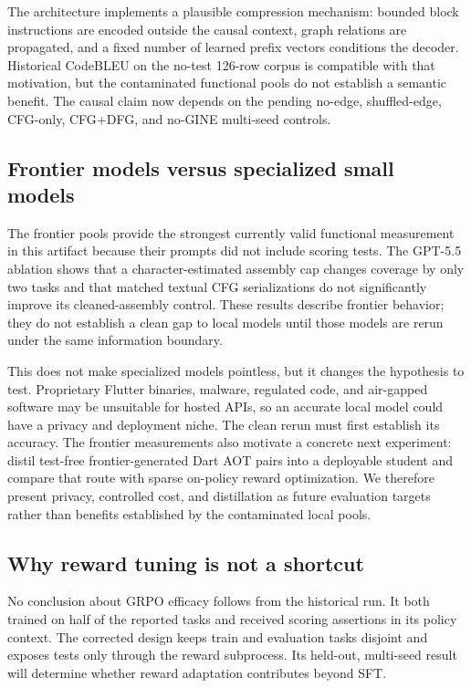 \documentclass[11pt]{article}
\begin{document}
The architecture implements a plausible compression mechanism: bounded block instructions are encoded outside the causal context, graph relations are propagated, and a fixed number of learned prefix vectors conditions the decoder. Historical CodeBLEU on the no-test 126-row corpus is compatible with that motivation, but the contaminated functional pools do not establish a semantic benefit. The causal claim now depends on the pending no-edge, shuffled-edge, CFG-only, CFG+DFG, and no-GINE multi-seed controls.

\subsection{Frontier models versus specialized small models}

The frontier pools provide the strongest currently valid functional measurement in this artifact because their prompts did not include scoring tests. The GPT-5.5 ablation shows that a character-estimated assembly cap changes coverage by only two tasks and that matched textual CFG serializations do not significantly improve its cleaned-assembly control. These results describe frontier behavior; they do not establish a clean gap to local models until those models are rerun under the same information boundary.

This does not make specialized models pointless, but it changes the hypothesis to test. Proprietary Flutter binaries, malware, regulated code, and air-gapped software may be unsuitable for hosted APIs, so an accurate local model could have a privacy and deployment niche. The clean rerun must first establish its accuracy. The frontier measurements also motivate a concrete next experiment: distil test-free frontier-generated Dart AOT pairs into a deployable student and compare that route with sparse on-policy reward optimization. We therefore present privacy, controlled cost, and distillation as future evaluation targets rather than benefits established by the contaminated local pools.

\subsection{Why reward tuning is not a shortcut}

No conclusion about GRPO efficacy follows from the historical run. It both trained on half of the reported tasks and received scoring assertions in its policy context. The corrected design keeps train and evaluation tasks disjoint and exposes tests only through the reward subprocess. Its held-out, multi-seed result will determine whether reward adaptation contributes beyond SFT.
\end{document}
